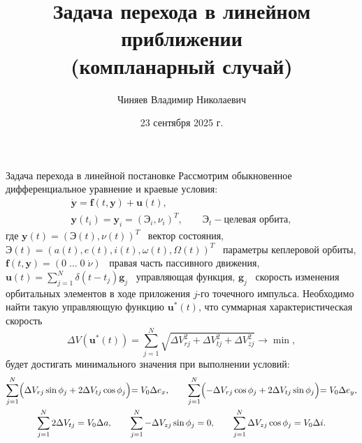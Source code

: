 \documentclass[9pt]{beamer}
\author[Автор]{Чиняев Владимир Николаевич}
\title{Задача перехода в линейном приближении \\ (компланарный случай)}
\institute[]{Московский физико технический институт}
\date{23 сентября 2025 г.}
\begin{document}
\begin{frame}
\titlepage
\end{frame}

\begin{frame}{Задача перехода в линейной постановке}
Рассмотрим обыкновенное дифференциальное уравнение и краевые условия:
\begin{gather*}
    \dot{\mathbf{y}} = \mathbf{f}(t, \mathbf{y}) + \mathbf{u}(t), \\
    \mathbf{y}(t_i) = \mathbf{y}_i = \left( \textbf{Э}_i, \nu_i \right)^T, \quad \quad
    \textbf{Э}_t - \text{целевая орбита},
\end{gather*}
где $\mathbf{y}(t) = \left( \textbf{Э}(t), \nu(t) \right)^T$ \textemdash\ вектор состояния, $\textbf{Э}(t)=\left( a(t), e(t), i(t), \omega(t), \Omega(t) \right)^T$ \textemdash\ параметры кеплеровой орбиты, $\mathbf{f}(t, \mathbf{y}) = (0 \; ... \; 0 \; \dot{\nu} )$ \textemdash\ правая часть пассивного движения, $\mathbf{u}(t) = \sum_{j=1}^N \delta(t - t_j) \mathbf{g}_j$ \textemdash\ управляющая функция, $\mathbf{g}_j$ \textemdash\ скорость изменения орбитальных элементов в ходе приложения $j$-го точечного импульса. Необходимо найти такую управляющую функцию $\mathbf{u}^*(t)$, что суммарная характеристическая скорость 
\begin{equation*}
    \Delta V (\mathbf{u}^*(t)) = \sum_{j=1}^N \sqrt{\Delta V_{rj}^2 + \Delta V_{tj}^2 + \Delta V_{zj}^2} \to \min,
\end{equation*}
будет достигать минимального значения при выполнении условий:
\begin{gather*}
        \sum_{j=1}^{N} \Bigl( \Delta V_{rj} \sin \phi_j + 2 \Delta V_{tj} \cos \phi_j \Bigl) = V_0 \Delta e_x, \quad \quad
        \sum_{j=1}^{N} \Bigl( -\Delta V_{rj} \cos \phi_j + 2 \Delta V_{tj} \sin \phi_j \Bigl) = V_0 \Delta e_y, \\
        \sum_{j=1}^{N} 2 \Delta V_{tj} = V_0 \Delta a, \quad \quad
        \sum_{j=1}^{N} -\Delta V_{zj} \sin \phi_j = 0, \quad \quad
        \sum_{j=1}^{N} \Delta V_{zj} \cos \phi_j = V_0 \Delta i.
    \end{gather*}
\end{frame}
\end{document}
